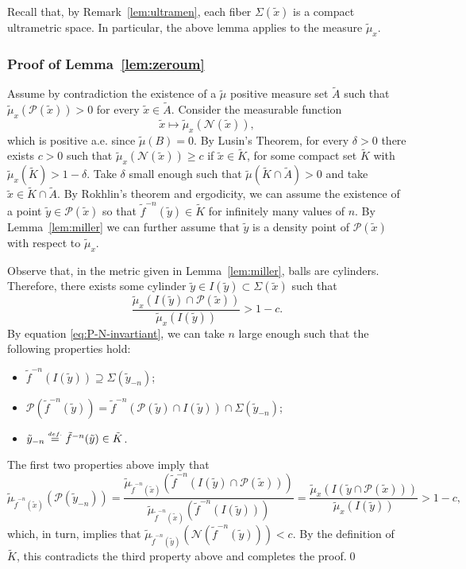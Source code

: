 \documentclass[a4paper,11pt,reqno]{amsart}
\newcommand{\cN}{{\mathcal N}}
\newcommand{\cP}{{\mathcal P}}
\newcommand{\eqdef}{\stackrel{\scriptscriptstyle\textrm def.}{=}}
\newcommand{\tix}{\tilde{x}}
\newcommand{\tif}{\tilde{f}}
\newcommand{\tm}{\tilde{\mu}}
\theoremstyle{definition}
\begin{document}
Recall that, by Remark~\ref{lem:ultramen}, each fiber $\Sigma(\tix)$ is a compact ultrametric space. In particular, the above lemma applies to the measure $\tm_x$. 

\subsubsection{Proof of Lemma~\ref{lem:zeroum}}
\label{sec:proof-0-ou-1}

Assume by contradiction the existence of a $\tilde{\mu}$ positive measure set $\tilde{A}$ such that $\tilde{\mu}_x(\cP(\tix))>0$ for every $\tix\in\tilde{A}$. Consider the measurable function 
\[
\tix\mapsto\tm_x(\cN(\tix)),
\] 
which is positive a.e. since $\tm(B)=0$. By Lusin's Theorem, for every $\delta>0$ there exists $c>0$ such that $\tm_x(\cN(\tix))\geq c$ if $\tix\in \tilde{K}$, for some compact set $\tilde{K}$ with $\tm_x(\tilde{K})>1-\delta$. Take $\delta$ small enough such that $\tm(\tilde{K}\cap \tilde{A})>0$ and take $\tix\in\tilde{K}\cap\tilde{A}.$ By Rokhlin's theorem and ergodicity, we can assume the existence of a point $\tilde{y}\in\cP(\tix)$ so that $\tilde{f}^{-n}(\tilde{y})\in\tilde{K}$ for infinitely many values of $n$. By Lemma~\ref{lem:miller} we can further assume that $\tilde{y}$ is a density point of $\cP(\tix)$ with respect to $\tm_x$. 

Observe that, in the metric given in Lemma~\ref{lem:miller}, balls are cylinders. Therefore, there exists some cylinder $\tilde{y}\in I(\tilde{y})\subset\Sigma(\tix)$  such that
\[
\frac{\tm_x(I(\tilde{y})\cap\cP(\tix))}{\tm_x(I(\tilde{y}))}>1-c.
\]
By equation \eqref{eq:P-N-invartiant}, we can take $n$ large enough such that the following properties hold:
\begin{itemize}
	\item $\tilde{f}^{-n}(I(\tilde{y}))\supseteq\Sigma(\tilde{y}_{-n})$;
	\item $\cP(\tilde{f}^{-n}(\tilde{y}))=\tilde{f}^{-n}(\cP(\tilde{y}) \cap I(\tilde{y}))\cap\Sigma(\tilde{y}_{-n})$;
	\item  $\tilde{y}_{-n}\eqdef\tif^{-n}(\tilde{y})\in\tilde{K}$.
\end{itemize}
The first two properties above imply that
\[
\tm_{\tilde{f}^{-n}(\tix)}(\cP(\tilde{y}_{-n})) = \frac{\tm_{\tilde{f}^{-n}(\tix)}(\tilde{f}^{-n}(I(\tilde{y})\cap\cP(\tix)))}{\tm_{\tilde{f}^{-n}(\tix)}(\tilde{f}^{-n}(I(\tilde{y})))} = \frac{\tm_x(I(\tilde{y}\cap\cP(\tix)))}{\tm_x(I(\tilde{y}))}>1-c,
\]
which, in turn, implies that $\tm_{\tilde{f}^{-n}(\tilde{y})}(\cN(\tilde{f}^{-n}(\tilde{y})))<c$. By the definition of $\tilde{K}$, this contradicts the third property above and completes the proof.\qed 
\end{document}
